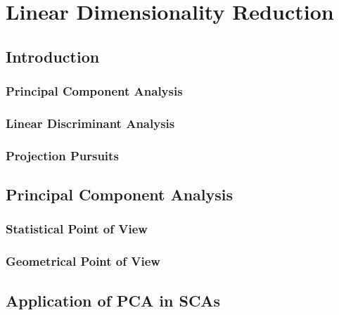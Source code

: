
\chapter{Linear Dimensionality Reduction} %
\label{ChapterLinear}


\section{Introduction}
\subsection{Principal Component Analysis}
\subsection{Linear Discriminant Analysis}
\subsection{Projection Pursuits}

\section{Principal Component Analysis}
\subsection{Statistical Point of View}
\subsection{Geometrical Point of View}

\section{Application of PCA in SCAs}
